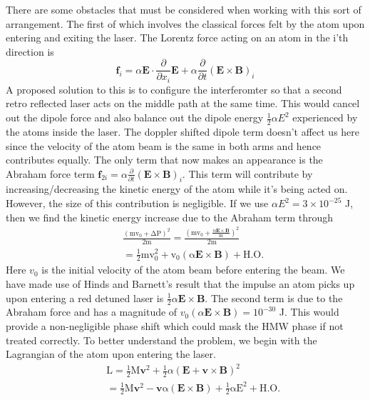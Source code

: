 \documentclass[twocolumn,english,pra,aps,superscriptaddress,floatfix]{revtex4-1}
\begin{document}
There are some obstacles that must be considered when working with this sort of arrangement.  The first of which involves the classical forces felt by the atom upon entering and exiting the laser.  The Lorentz force acting on an atom in the i'th direction is
\begin{equation}
\mathbf{f}_i= \alpha\mathbf{E}\cdot\frac{\partial}{\partial x_i}\mathbf{E}+\alpha\frac{\partial}{\partial t}\left(\mathbf{E}\times\mathbf{B}\right)_i
\label{lorentz4}
\end{equation}
A proposed solution to this is to configure the interferomter so that a second retro reflected laser acts on the middle path at the same time.  This would cancel out the dipole force and also balance out the dipole energy $\frac{1}{2}\alpha E^2$ experienced by the atoms inside the laser.  
The doppler shifted dipole term doesn't affect us here since the velocity of the atom beam is the same in both arms and hence contributes equally.  The only term that now makes an appearance is the Abraham force term $\mathbf{f}_{2i}= \alpha\frac{\partial}{\partial t}\left(\mathbf{E}\times\mathbf{B}\right)_i$.  This term will contribute by increasing/decreasing the kinetic energy of the atom while it's being acted on.  However, the size of this contribution is negligible.  If we use $\alpha E^2=3\times 10^{-25}$ J, then we find the kinetic energy increase due to the Abraham term through
\begin{eqnarray}
&&\mathrm{\frac{(mv_0+ \Delta P)^2}{2m}=\frac{(mv_0+\frac{\alpha\mathbf{E}\times\mathbf{B}}{m})^2}{2m}} \nonumber \\
&&\mathrm{=\frac{1}{2}mv_0^2+v_0(\alpha\mathbf{E}\times\mathbf{B}) +H.O.}
\end{eqnarray}
Here $v_0$ is the initial velocity of the atom beam before entering the beam.  We have made use of Hinds and Barnett's result \cite{hinds} that the impulse an atom picks up upon entering a red detuned laser is $\frac{1}{2}\alpha\mathbf{E}\times\mathbf{B}$.  The second term is due to the Abraham force and has a magnitude of $v_0(\alpha\mathbf{E}\times\mathbf{B})=10^{-30}$ J.  This would provide a non-negligible phase shift which could mask the HMW phase if not treated correctly.  
To better understand the problem, we begin with the Lagrangian of the atom upon entering the laser.
\begin{eqnarray}
&&\mathrm{L}=\frac{1}{2}\mathrm{M}\mathbf{v}^2 + \frac{1}{2}\alpha\left(\mathbf{E} +\mathbf{v}\times\mathbf{B}\right)^2 \nonumber \\
&&=\frac{1}{2}\mathrm{M\mathbf{v}^2 - \mathbf{v}\alpha(\mathbf{E}\times\mathbf{B})+\frac{1}{2}\alpha E^2 +H.O.}
\label{lagrangian3}
\end{eqnarray}
\end{document}
